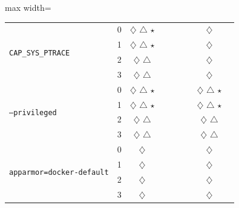 \begin{doublespace}
\begin{table}[!h]
\begin{adjustbox}{max width=\textwidth}
\begin{tabular}{|l|c|c|c|c|c|c|c|c|}
        \multirow{4}{*}{\texttt{CAP\_SYS\_PTRACE}} 
            & 0 & $\diamondsuit$ $\triangle$ $\star$ &  &  &  &  & $\diamondsuit$ \\
            & 1 & $\diamondsuit$ $\triangle$ $\star$ &  &  &  &  & $\diamondsuit$ \\
            & 2 & $\diamondsuit$ $\triangle$ &  &  &  &  & $\diamondsuit$ \\
            & 3 & $\diamondsuit$ $\triangle$ &  &  &  &  & $\diamondsuit$ \\
        \hline

        \multirow{4}{*}{\texttt{--privileged}} 
            & 0 & $\diamondsuit$ $\triangle$ $\star$ &  &  &  &  & $\diamondsuit$ $\triangle$ $\star$ \\
            & 1 & $\diamondsuit$ $\triangle$ $\star$ &  &  &  &  & $\diamondsuit$ $\triangle$ $\star$ \\
            & 2 & $\diamondsuit$ $\triangle$ &  &  &  &  & $\diamondsuit$ $\triangle$ \\
            & 3 & $\diamondsuit$ $\triangle$ &  &  &  &  & $\diamondsuit$ $\triangle$ \\
        \hline

        \multirow{4}{*}{\texttt{apparmor=docker-default}} 
            & 0 & $\diamondsuit$ &  &  &  &  & $\diamondsuit$ \\
            & 1 & $\diamondsuit$ &  &  &  &  & $\diamondsuit$ \\
            & 2 & $\diamondsuit$ &  &  &  &  & $\diamondsuit$ \\
            & 3 & $\diamondsuit$ &  &  &  &  & $\diamondsuit$ \\
        \hline


\end{tabular}
\end{adjustbox}
\end{table}
\end{doublespace}
